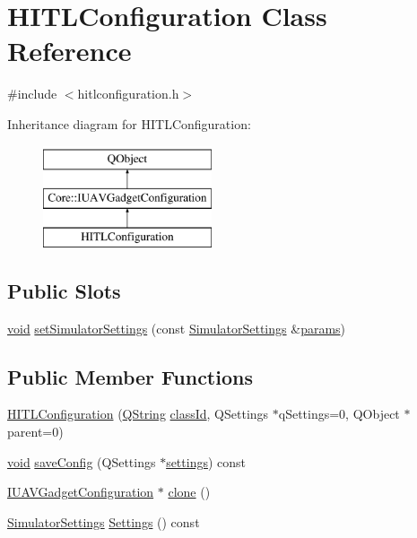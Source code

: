 \hypertarget{class_h_i_t_l_configuration}{\section{H\-I\-T\-L\-Configuration Class Reference}
\label{class_h_i_t_l_configuration}
}


{\ttfamily \#include $<$hitlconfiguration.\-h$>$}

Inheritance diagram for H\-I\-T\-L\-Configuration\-:\begin{figure}[H]
\begin{center}
\leavevmode
\includegraphics[height=3.000000cm]{class_h_i_t_l_configuration}
\end{center}
\end{figure}
\subsection*{Public Slots}
\begin{DoxyCompactItemize}
\item 
\hyperlink{group___u_a_v_objects_plugin_ga444cf2ff3f0ecbe028adce838d373f5c}{void} \hyperlink{group___h_i_t_l_plugin_gacd597e5682d8dbe29504ed7c45245695}{set\-Simulator\-Settings} (const \hyperlink{group___h_i_t_l_plugin_ga052199f1328d3002bce3e45345aa7f4e}{Simulator\-Settings} \&\hyperlink{glext_8h_afeb6390ab3bc8a0e96a88aff34d52288}{params})
\end{DoxyCompactItemize}
\subsection*{Public Member Functions}
\begin{DoxyCompactItemize}
\item 
\hyperlink{group___h_i_t_l_plugin_ga7d0ecee89fe45b55113d77ae668a7777}{H\-I\-T\-L\-Configuration} (\hyperlink{group___u_a_v_objects_plugin_gab9d252f49c333c94a72f97ce3105a32d}{Q\-String} \hyperlink{group___core_plugin_gac953657221ba7fda967ada0408332641}{class\-Id}, Q\-Settings $\ast$q\-Settings=0, Q\-Object $\ast$parent=0)
\item 
\hyperlink{group___u_a_v_objects_plugin_ga444cf2ff3f0ecbe028adce838d373f5c}{void} \hyperlink{group___h_i_t_l_plugin_ga8ae31be95aaf6385511e9387aa0a49b3}{save\-Config} (Q\-Settings $\ast$\hyperlink{group___h_i_t_l_plugin_ga961f33f3db5f79daaf792a4999ac5c06}{settings}) const 
\item 
\hyperlink{group___core_plugin_gacdfdf0b1e39b5002472b76b6564ce51f}{I\-U\-A\-V\-Gadget\-Configuration} $\ast$ \hyperlink{group___h_i_t_l_plugin_gaf448a961e8785490a4dcc5187d7edbe6}{clone} ()
\item 
\hyperlink{group___h_i_t_l_plugin_ga052199f1328d3002bce3e45345aa7f4e}{Simulator\-Settings} \hyperlink{group___h_i_t_l_plugin_ga993f772c2a086edf053d851849caa984}{Settings} () const 
\end{DoxyCompactItemize}
